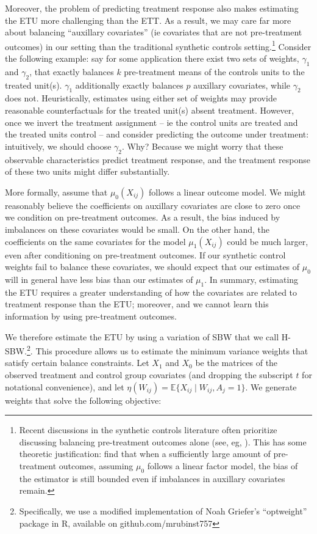 \documentclass[12pt]{article}
\begin{document}
Moreover, the problem of predicting treatment response also makes estimating the ETU more challenging than the ETT. As a result, we may care far more about balancing ``auxillary covariates'' (ie covariates that are not pre-treatment outcomes) in our setting than the traditional synthetic controls setting.\footnote{Recent discussions in the synthetic controls literature often prioritize discussing balancing pre-treatment outcomes alone (see, eg, \cite{doudchenko2016balancing}). This has some theoretic justification: \cite{botosaru2019role} find that when a sufficiently large amount of pre-treatment outcomes, assuming $\mu_0$ follows a linear factor model, the bias of the estimator is still bounded even if imbalances in auxillary covariates remain.} Consider the following example: say for some application there exist two sets of weights, $\gamma_1$ and $\gamma_2$, that exactly balances $k$ pre-treatment means of the controls units to the treated unit(s). $\gamma_1$ additionally exactly balances $p$ auxillary covariates, while $\gamma_2$ does not. Heuristically, estimates using either set of weights may provide reasonable counterfactuals for the treated unit(s) absent treatment. However, once we invert the treatment assignment -- ie the control units are treated and the treated units control -- and consider predicting the outcome under treatment: intuitively, we should choose $\gamma_2$. Why? Because we might worry that these observable characteristics predict treatment response, and the treatment response of these two units might differ substantially. 

More formally, assume that $\mu_0(X_{ij})$ follows a linear outcome model. We might reasonably believe the coefficients on auxillary covariates are close to zero once we condition on pre-treatment outcomes. As a result, the bias induced by imbalances on these covariates would be small. On the other hand, the coefficients on the same covariates for the model $\mu_1(X_{ij})$ could be much larger, even after conditioning on pre-treatment outcomes. If our synthetic control weights fail to balance these covariates, we should expect that our estimates of $\mu_0$ will in general have less bias than our estimates of $\mu_1$. In summary, estimating the ETU requires a greater understanding of how the covariates are related to treatment response than the ETU; moreover, and we cannot learn this information by using pre-treatment outcomes.

We therefore estimate the ETU by using a variation of SBW that we call H-SBW.\footnote{Specifically, we use a modified implementation of Noah Griefer's ``optweight'' package in R, available on github.com/mrubinst757}. This procedure allows us to estimate the minimum variance weights that satisfy certain balance constraints. Let $X_1$ and $X_0$ be the matrices of the observed treatment and control group covariates (and dropping the subscript $t$ for notational convenience), and let $\eta(W_{ij}) = \mathbb{E}\{X_{ij} \mid W_{ij}, A_j = 1\}$. We generate weights that solve the following objective:
\end{document}
